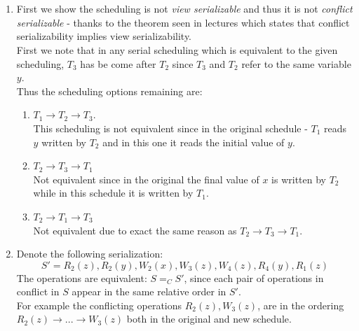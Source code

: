 \documentclass{article}
\begin{document}
\section{}
\subsection{}

\begin{enumerate}[label=\roman*.]
    \item 
    First we show the scheduling is not \emph{view serializable}
    and thus it is not \emph{conflict serializable} - thanks to the theorem
    seen in lectures which states that conflict serializability implies view serializability.\\

    First we note that in any serial scheduling which is equivalent to the given scheduling,
    $T_3$ has be come after $T_2$ since $T_3$ and $T_2$ refer to the same variable $y$.\\
    Thus the scheduling options remaining are:
    \begin{enumerate}
        \item $T_1\rightarrow T_2\rightarrow T_3$.\\
        This scheduling is not equivalent since in the original
        schedule - $T_1$ reads $y$ written by $T_2$ and in this one it reads the initial value of $y$.
        \item $T_2\rightarrow T_3\rightarrow T_1$\\
        Not equivalent since in the original the final value of $x$ is written by $T_2$
        while in this schedule it is written by $T_1$.
        \item $T_2\rightarrow T_1\rightarrow T_3$\\
        Not equivalent due to exact the same reason as $T_2\rightarrow T_3\rightarrow T_1$.
    \end{enumerate}
    \item  Denote the following serialization:
    $$
    S'=R_2(z), R_2(y), W_2(x), W_3(z), W_4(z), R_4(y), R_1(z)
    $$
    The operations are equivalent: $S=_CS'$, since each pair of operations
    in conflict in $S$ appear in the same relative order in $S'$.\\
    For example the
    conflicting operations $R_2(z), W_3(z)$, are in the ordering\\
    $R_2(z)\rightarrow ...\rightarrow W_3(z)$
    both in the original and new schedule.\\
    

\end{enumerate}
\end{document}

